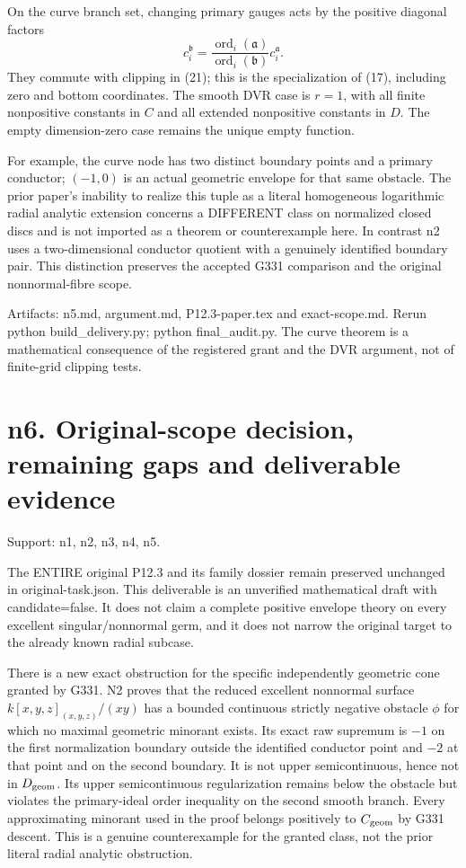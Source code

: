 \documentclass[11pt]{article}
\begin{document}
On the curve branch set, changing primary gauges acts by the positive diagonal factors
\[
c_i^{\mathfrak b}=
\frac{\operatorname{ord}_i(\mathfrak a)}{\operatorname{ord}_i(\mathfrak b)}
c_i^{\mathfrak a}.
\]
They commute with clipping in (21); this is the specialization of (17), including zero and bottom coordinates. The smooth DVR case is \(r=1\), with all finite nonpositive constants in \(C\) and all extended nonpositive constants in \(D\). The empty dimension-zero case remains the unique empty function.

For example, the curve node has two distinct boundary points and a primary conductor; \((-1,0)\) is an actual geometric envelope for that same obstacle. The prior paper's inability to realize this tuple as a literal homogeneous logarithmic radial analytic extension concerns a DIFFERENT class on normalized closed discs and is not imported as a theorem or counterexample here. In contrast n2 uses a two-dimensional conductor quotient with a genuinely identified boundary pair. This distinction preserves the accepted G331 comparison and the original nonnormal-fibre scope.

Artifacts: n5.md, argument.md, P12.3-paper.tex and exact-scope.md. Rerun python build\_delivery.py; python final\_audit.py. The curve theorem is a mathematical consequence of the registered grant and the DVR argument, not of finite-grid clipping tests.

\section{n6. Original-scope decision, remaining gaps and deliverable evidence}

Support: n1, n2, n3, n4, n5.

The ENTIRE original P12.3 and its family dossier remain preserved unchanged in original-task.json. This deliverable is an unverified mathematical draft with candidate=false. It does not claim a complete positive envelope theory on every excellent singular/nonnormal germ, and it does not narrow the original target to the already known radial subcase.

There is a new exact obstruction for the specific independently geometric cone granted by G331. N2 proves that the reduced excellent nonnormal surface \(k[x,y,z]_{(x,y,z)}/(xy)\) has a bounded continuous strictly negative obstacle \(\phi\) for which no maximal geometric minorant exists. Its exact raw supremum is \(-1\) on the first normalization boundary outside the identified conductor point and \(-2\) at that point and on the second boundary. It is not upper semicontinuous, hence not in \(D_{\rm geom}\). Its upper semicontinuous regularization remains below the obstacle but violates the primary-ideal order inequality on the second smooth branch. Every approximating minorant used in the proof belongs positively to \(C_{\rm geom}\) by G331 descent. This is a genuine counterexample for the granted class, not the prior literal radial analytic obstruction.
\end{document}
